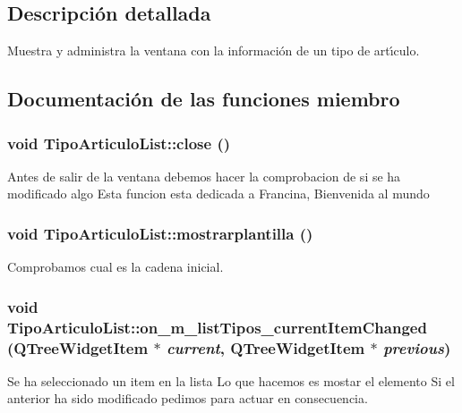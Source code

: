 \subsection{Descripci\'{o}n detallada}
Muestra y administra la ventana con la informaci\'{o}n de un tipo de art\'{\i}culo. 



\subsection{Documentaci\'{o}n de las funciones miembro}
\subsubsection{\setlength{\rightskip}{0pt plus 5cm}void Tipo\-Articulo\-List::close ()\hspace{0.3cm}{\tt  [virtual, slot]}}\label{classTipoArticuloList_i0}


Antes de salir de la ventana debemos hacer la comprobacion de si se ha modificado algo Esta funcion esta dedicada a Francina, Bienvenida al mundo 
\subsubsection{\setlength{\rightskip}{0pt plus 5cm}void Tipo\-Articulo\-List::mostrarplantilla ()}\label{classTipoArticuloList_a3}


Comprobamos cual es la cadena inicial. 
\subsubsection{\setlength{\rightskip}{0pt plus 5cm}void Tipo\-Articulo\-List::on\_\-m\_\-list\-Tipos\_\-current\-Item\-Changed (QTree\-Widget\-Item $\ast$ {\em current}, QTree\-Widget\-Item $\ast$ {\em previous})\hspace{0.3cm}{\tt  [virtual, slot]}}\label{classTipoArticuloList_i1}


Se ha seleccionado un item en la lista Lo que hacemos es mostar el elemento Si el anterior ha sido modificado pedimos para actuar en consecuencia.

